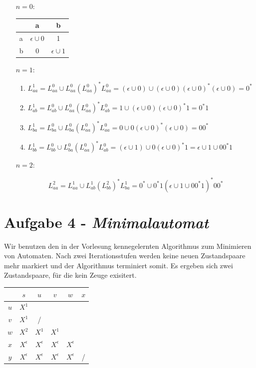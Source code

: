 \documentclass{article}
\begin{document}
\begin{enumerate}
	\item[$n=0$:]
	
	\begin{tabular}{l|cc}
		& a & b \\\hline
		a & $\epsilon \cup 0$ & 1 \\
		b & 0  & $\epsilon \cup 1$ \\
	\end{tabular}

	\item[$n=1$:]
	\begin{enumerate}[1.]
		\item $L_{aa}^1 = L_{aa}^0 \cup L_{aa}^0 (L_{aa}^0)^* L_{aa}^0 = (\epsilon \cup 0) \cup (\epsilon \cup 0)(\epsilon \cup 0)^*(\epsilon \cup 0) = 0^*$
		\item $L_{ab}^1 = L_{ab}^0 \cup L_{aa}^0 (L_{aa}^0)^* L_{ab}^0 = 1 \cup (\epsilon \cup 0)(\epsilon \cup 0)^*1 = 0^*1$
		\item $L_{ba}^1 = L_{ba}^0 \cup L_{ba}^0 (L_{aa}^0)^* L_{aa}^0 = 0 \cup 0(\epsilon \cup 0)^* (\epsilon \cup 0) = 00^*$
		\item $L_{bb}^1 = L_{bb}^0 \cup L_{ba}^0 (L_{aa}^0)^* L_{ab}^0 = (\epsilon \cup 1) \cup 0(\epsilon \cup 0)^* 1 = \epsilon \cup 1 \cup 00^*1$
	\end{enumerate}

	\item[$n=2$:]
	
	\begin{equation}
		L_{aa}^2 = L_{aa}^1 \cup L_{ab}^1 (L_{bb}^2)^* L_{ba}^1 = 0^* \cup 0^*1 (\epsilon \cup 1 \cup 00^*1)^* 00^*
	\end{equation}
	
	
\end{enumerate}


\section*{Aufgabe 4 - \textit{Minimalautomat}}

Wir benutzen den in der Vorlesung kennegelernten Algorithmus zum Minimieren von Automaten. Nach zwei Iterationsstufen werden keine neuen Zustandspaare mehr markiert und der Algorithmus terminiert somit. Es ergeben sich zwei Zustandspaare, für die kein Zeuge exisitert.

\begin{table}[h]
	\begin{tabular}{c|ccccc}
		& $s$ & $u$ & $v$ & $w$ & $x$\\\hline
		$u$ & $X^1$ &&&&\\
		$v$ &  $X^1$ & / &&&\\
		$w$ &  $X^2$ & $X^1$ &$ X^1$ &&\\
		$x$ &  $X^\epsilon$ & $X^\epsilon$ & $X^\epsilon$ & $X^\epsilon$ &\\
		$y$ & $X^\epsilon$ & $X^\epsilon$ & $X^\epsilon$ & $X^\epsilon$ & /\\
	\end{tabular}
\end{table}
\end{document}
